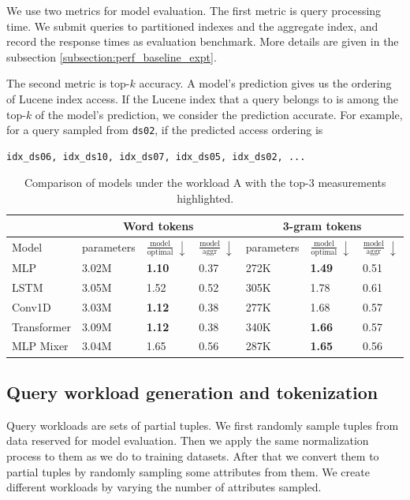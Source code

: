 \documentclass[conference]{IEEEtran}
\begin{document}
We use two metrics for model evaluation. The first metric is query processing time. We submit queries to partitioned indexes and the aggregate index, and record the response times as evaluation benchmark. More details are given in the subsection \ref{subsection:perf_baseline_expt}.

The second metric is top-$k$ accuracy. A model's prediction gives us the ordering of Lucene index access. If the Lucene index that a query belongs to is among the top-$k$ of the model's prediction, we consider the prediction accurate. For example, for a query sampled from \verb|ds02|, if the predicted access ordering is 
\begin{verbatim}
idx_ds06, idx_ds10, idx_ds07, idx_ds05, idx_ds02, ...
\end{verbatim}

\begin{table}[t]
    \centering
    \begin{tabularx}{\textwidth}{|l|X||X|X||X|X|X|}
    \hline
    &    \multicolumn{3}{|c|}{Word tokens} & \multicolumn{3}{|c|}{3-gram tokens} \\ \hline
    Model 
        & parameters
        & $\frac{\mathrm{model}}{\mathrm{optimal}}\ \downarrow$
        & $\frac{\mathrm{model}}{\mathrm{aggr}}\ \downarrow$ 
        & parameters
        & $\frac{\mathrm{model}}{\mathrm{optimal}}\ \downarrow$
        & $\frac{\mathrm{model}}{\mathrm{aggr}}\ \downarrow$
        \\ \hline
    MLP & 3.02M & {\bf 1.10} & 0.37 & 272K & {\bf 1.49} & 0.51\\
    LSTM & 3.05M & 1.52 & 0.52 & 305K & 1.78 & 0.61 \\
    Conv1D & 3.03M & {\bf 1.12} & 0.38 & 277K & 1.68 & 0.57 \\
    Transformer & 3.09M & {\bf 1.12} & 0.38 & 340K & {\bf 1.66} & 0.57 \\
    MLP Mixer & 3.04M & 1.65 & 0.56 & 287K & {\bf 1.65} & 0.56 \\ \hline
    \end{tabularx}
    \caption{Comparison of models under the workload A with the top-3 measurements highlighted.}
    \label{tab:model-comparison}
\end{table}

\subsection{Query workload generation and tokenization}
\label{subsection:query_workload_gen}
Query workloads are sets of partial tuples. 
We first randomly sample tuples from data reserved for model evaluation. 
Then we apply the same normalization process to them as we do to training datasets. 
After that we convert them to partial tuples by randomly sampling some attributes from them.
We create different workloads by varying the number of attributes sampled.
\end{document}
